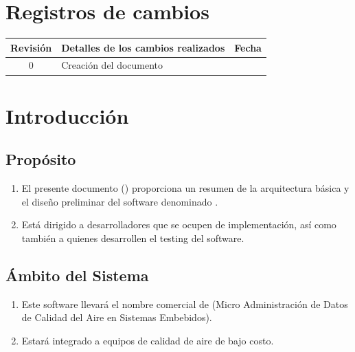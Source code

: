 \documentclass[
11pt, %
codirector, %
]{charter}
\begin{document}
	
	\maketitle
	\tableofcontents
	
	\newpage
	
	\section*{Registros de cambios}
	\label{sec:registro}
	
	
	\begin{table}[ht]
		\label{tab:registro}
		\centering
		\begin{tabularx}{\linewidth}{@{}|c|X|c|@{}}
			\hline
			\rowcolor[HTML]{C0C0C0} 
			Revisión & \multicolumn{1}{c|}{\cellcolor[HTML]{C0C0C0}Detalles de los cambios realizados} & Fecha      \\ \hline
			0      & Creación del documento                                 &\fechaInicioName \\ \hline
			\hline
			
		\end{tabularx}
		\label{sec:cierre}
	\end{table}
	
	\pagebreak
	
	
\section{Introducción}
\subsection{Propósito}
\begin{enumerate}
	\item El presente documento (\CODrequerimiento) proporciona un resumen de la arquitectura básica y el diseño preliminar del software denominado \namesoftware.
	\item Está dirigido a desarrolladores que se ocupen de implementación, así como también a quienes desarrollen el testing del software.
\end{enumerate}

\subsection{Ámbito del Sistema}
\begin{enumerate}
	\item Este software llevará el nombre comercial de \namesoftware  (Micro Administración de Datos de Calidad del Aire en Sistemas Embebidos).
	\item Estará integrado a equipos de calidad de aire de bajo costo.
\end{enumerate}
\end{document}
